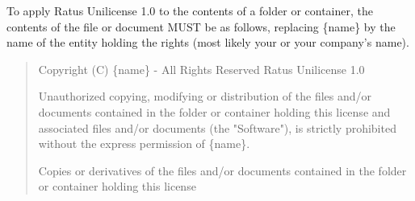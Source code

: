 \documentclass[a4paper,12pt]{article}
\begin{document}
  To apply Ratus Unilicense 1.0 to the contents of a folder or container, the
  contents of the  file or document MUST be as follows,
  replacing \{name\} by the name of the entity holding the rights (most likely
  your or your company's name).

  \begin{quote}
    Copyright (C) \{name\} - All Rights Reserved
    Ratus Unilicense 1.0

    Unauthorized copying, modifying or distribution of the files and/or
    documents contained in the folder or container holding this license and
    associated files and/or documents (the "Software"), is strictly prohibited
    without the express permission of \{name\}.

    Copies or derivatives of the files and/or documents contained in the folder
    or container holding this license
  \end{quote}


\end{document}
